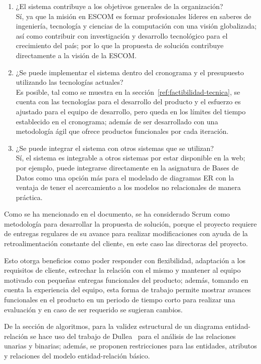 \begin{enumerate}
    \item ¿El sistema contribuye a los objetivos generales de la organización?\\ Sí, ya que la misión en ESCOM es formar profesionales líderes en saberes de ingeniería, tecnología y ciencias de la computación con una visión globalizada; así como contribuir con investigación y desarrollo tecnológico para el crecimiento del país; por lo que la propuesta de solución contribuye directamente a la visión de la ESCOM.
    \item ¿Se puede implementar el sistema dentro del cronograma y el presupuesto utilizando las tecnologías actuales? \\Es posible, tal como se muestra en la sección~\ref{ref:factibilidad-tecnica}, se cuenta con las tecnologías para el desarrollo del producto y el esfuerzo es ajustado para el equipo de desarrollo, pero queda en los límites del tiempo establecido en el cronograma; además de ser desarrollado con una metodología ágil que ofrece productos funcionales por cada iteración.
    \item ¿Se puede integrar el sistema con otros sistemas que se utilizan?\\ Sí, el sistema es integrable a otros sistemas por estar disponible en la web; por ejemplo, puede integrarse directamente en la asignatura de Bases de Datos como una opción más para el modelado de diagramas ER con la ventaja de tener el acercamiento a los modelos no relacionales de manera práctica.
\end{enumerate}


Como se ha mencionado en el documento, se ha considerado Scrum como metodología para desarrollar la propuesta de solución, porque el proyecto requiere de entregas regulares de su avance para realizar modificaciones con ayuda de la retroalimentación constante del cliente, en este caso las directoras del proyecto.


Esto otorga beneficios como poder responder con flexibilidad, adaptación a los requisitos de cliente, estrechar la relación con el mismo y mantener al equipo motivado con pequeñas entregas funcionales del producto; además, tomando en cuenta la experiencia del equipo, esta forma de trabajo permite mostrar avances funcionales en el producto en un periodo de tiempo corto para realizar una evaluación y en caso de ser requerido se sugieran cambios.


De la sección de algoritmos, para la validez estructural de un diagrama entidad-relación se hace uso del trabajo de Dullea~\cite{dullea_analysis_2003} para el análisis de las relaciones unarias y binarias; además, se proponen restricciones para las entidades, atributos y relaciones del modelo entidad-relación básico.


